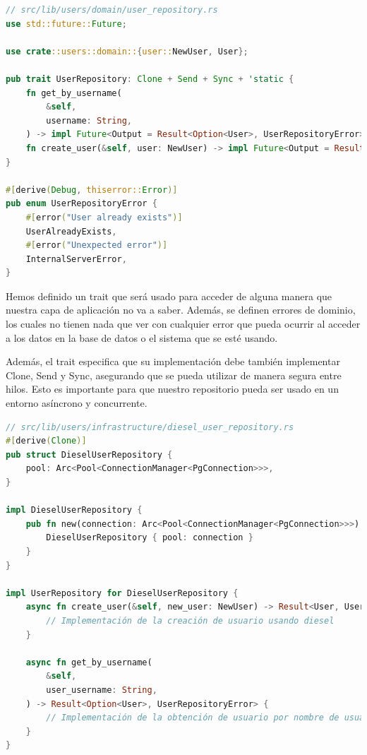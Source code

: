 \begin{lstlisting}[language=Rust, caption={Trait de repositorio de usuarios}, label={lst:trait-repository}]
// src/lib/users/domain/user_repository.rs
use std::future::Future;

use crate::users::domain::{user::NewUser, User};

pub trait UserRepository: Clone + Send + Sync + 'static {
    fn get_by_username(
        &self,
        username: String,
    ) -> impl Future<Output = Result<Option<User>, UserRepositoryError>> + Send;
    fn create_user(&self, user: NewUser) -> impl Future<Output = Result<User, UserRepositoryError>> + Send;
}

#[derive(Debug, thiserror::Error)]
pub enum UserRepositoryError {
    #[error("User already exists")]
    UserAlreadyExists,
    #[error("Unexpected error")]
    InternalServerError,
}
\end{lstlisting}
Hemos definido un trait que será usado para acceder de alguna manera que nuestra capa de aplicación no va a saber. Además, se definen errores de dominio, los cuales no tienen nada que ver con cualquier error que pueda ocurrir al acceder a los datos en la base de datos o el sistema que se esté usando.

Además, el trait especifica que su implementación debe también implementar Clone, Send y Sync, asegurando que se pueda utilizar de manera segura entre hilos. Esto es importante para que nuestro repositorio pueda ser usado en un entorno asíncrono y concurrente.

\begin{lstlisting}[language=Rust, caption={Implementación del repositorio de usuarios}, label={lst:impl-repository}]
// src/lib/users/infrastructure/diesel_user_repository.rs
#[derive(Clone)]
pub struct DieselUserRepository {
    pool: Arc<Pool<ConnectionManager<PgConnection>>>,
}

impl DieselUserRepository {
    pub fn new(connection: Arc<Pool<ConnectionManager<PgConnection>>>) -> Self {
        DieselUserRepository { pool: connection }
    }
}

impl UserRepository for DieselUserRepository {
    async fn create_user(&self, new_user: NewUser) -> Result<User, UserRepositoryError> {
        // Implementación de la creación de usuario usando diesel
    }

    async fn get_by_username(
        &self,
        user_username: String,
    ) -> Result<Option<User>, UserRepositoryError> {
        // Implementación de la obtención de usuario por nombre de usuario usando diesel
    }
}
\end{lstlisting}

